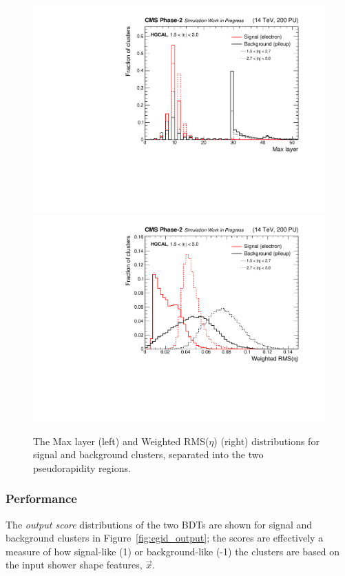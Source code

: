 \begin{figure}[htb!]
  \centering
  \includegraphics[width=.49\textwidth]{Figures/cms/egid/cl3d_maxlayer.pdf}
  \includegraphics[width=.49\textwidth]{Figures/cms/egid/cl3d_seetot.pdf}
  \caption[$e/\gamma$ identification input feature distributions]
  {
    The Max layer (left) and Weighted RMS($\eta$) (right) distributions for signal and background clusters, separated into the two pseudorapidity regions.
  }
  \label{fig:egid_features}
\end{figure}

\subsubsection{Performance}
The \textit{output score} distributions of the two BDTs are shown for signal and background clusters in Figure~\ref{fig:egid_output}; the scores are effectively a measure of how signal-like (1) or background-like (-1) the clusters are based on the input shower shape features, $\vec{x}$. 

